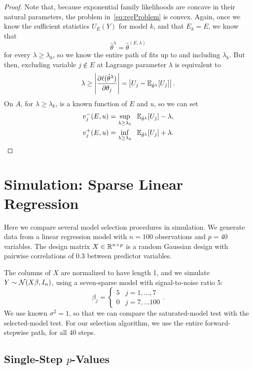 \documentclass{article}
\begin{document}
\begin{proof}
  Note that, because exponential family likelihoods are concave in their natural parameters, the problem in~\eqref{eq:regProblem} is convex. Again, once we know the sufficient statistics $U_E(Y)$ for model $k$, and that $E_k=E$, we know that
  \[
  \hat\theta^\lambda = \hat\theta^{(E,\lambda)}
  \]
  for every $\lambda \geq \lambda_k$, so we know the entire path of fits up to and including $\lambda_k$. But then, excluding variable $j \notin E$ at Lagrange parameter $\lambda$ is equivalent to
  \[
  \lambda \geq 
  \left| \frac{\partial \ell(\hat\theta^\lambda)}{\partial \theta_j} \right|
  = \left|U_j - \mathbb{E}_{\hat\theta^\lambda}[U_j]\right|.
  \]
  On $A$, for $\lambda \geq\lambda_k$, 
  \smash{$\E_{\hat\theta^\lambda}[U_j]$} is a known function of $E$ and $u$,
  so we can set
  \begin{align}\label{eq:vMinus_L1}
    v_j^-(E,u) &= \sup_{\lambda \geq \lambda_k} \;\; 
    \mathbb{E}_{\hat\theta^\lambda}[U_j] - \lambda, \\
    \label{eq:vPlus_L1}
    v_j^+(E,u) &= \inf_{\lambda \geq \lambda_k} \;\;
    \mathbb{E}_{\hat\theta^\lambda}[U_j] + \lambda.
  \end{align}
\end{proof}

\section{Simulation: Sparse Linear Regression}
\label{sec:sparseReg}

Here we compare several model selection procedures in simulation. We generate data from a linear regression model with $n=100$ observations and $p=40$ variables. The design matrix $X\in\mathbb{R}^{n\times p}$ is a random Gaussian design with pairwise correlations of 0.3 between predictor variables.

The columns of $X$ are normalized to have length 1, and we simulate $Y \sim \mathcal{N}(X\beta,I_n)$, using a seven-sparse model with signal-to-noise ratio 5:
\[
\beta_j = \left\{\begin{matrix}5 & j = 1,\ldots,7\\ 0 &
    j = 7,\ldots 100 \end{matrix}\right. .
\]
We use known $\sigma^2=1$, so that we can compare the saturated-model test with the selected-model test. For our selection algorithm, we use the entire forward-stepwise path, for all 40 steps. 

\subsection{Single-Step $p$-Values}
\end{document}

